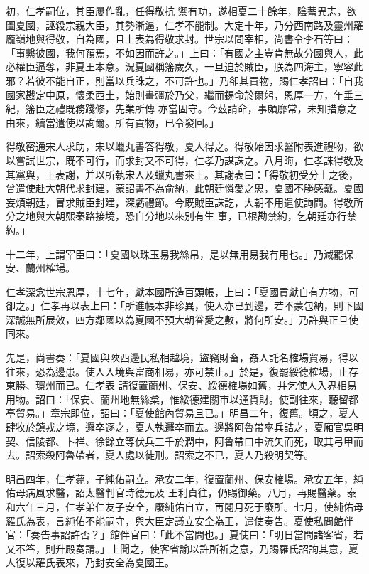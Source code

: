 \begin{pinyinscope}
 初，仁孝嗣位，其臣屢作亂，任得敬抗
 禦有功，遂相夏二十餘年，陰蓄異志，欲圖夏國，誣殺宗親大臣，其勢漸逼，仁孝不能制。大定十年，乃分西南路及靈州羅龐嶺地與得敬，自為國，且上表為得敬求封。世宗以問宰相，尚書令李石等曰：「事繫彼國，我何預焉，不如因而許之。」上曰：「有國之主豈肯無故分國與人，此必權臣逼奪，非夏王本意。況夏國稱籓歲久，一旦迫於賊臣，朕為四海主，寧容此邪？若彼不能自正，則當以兵誅之，不可許也。」乃卻其貢物，賜仁孝詔曰：「自我國家戡定中原，懷柔西土，始則畫疆於乃父，繼而錫命於爾躬，恩厚一方，年垂三紀，籓臣之禮既務踐修，先業所傳
 亦當固守。今茲請命，事頗靡常，未知措意之由來，續當遣使以詢爾。所有貢物，已令發回。」



 得敬密通宋人求助，宋以蠟丸書答得敬，夏人得之。得敬始因求醫附表進禮物，欲以嘗試世宗，既不可行，而求封又不可得，仁孝乃謀誅之。八月晦，仁孝誅得敬及其黨與，上表謝，并以所執宋人及蠟丸書來上。其謝表曰：「得敬初受分土之後，曾遣使赴大朝代求封建，蒙詔書不為俞納，此朝廷憐愛之恩，夏國不勝感戴。夏國妄煩朝廷，冒求賊臣封建，深虧禮節。今既賊臣誅訖，大朝不用遣使詢問。得敬所分之地與大朝熙秦路接境，恐自分地以來別有生
 事，已根勘禁約，乞朝廷亦行禁約。」



 十二年，上謂宰臣曰：「夏國以珠玉易我絲帛，是以無用易我有用也。」乃減罷保安、蘭州榷場。



 仁孝深念世宗恩厚，十七年，獻本國所造百頭帳，上曰：「夏國貢獻自有方物，可卻之。」仁孝再以表上曰：「所進帳本非珍異，使人亦已到邊，若不蒙包納，則下國深誠無所展效，四方鄰國以為夏國不預大朝眷愛之數，將何所安。」乃許與正旦使同來。



 先是，尚書奏：「夏國與陜西邊民私相越境，盜竊財畜，姦人託名榷場貿易，得以往來，恐為邊患。使人入境與富商相易，亦可禁止。」於是，復罷綏德榷場，止存東勝、環州而已。仁孝表
 請復置蘭州、保安、綏德榷場如舊，并乞使人入界相易用物。詔曰：「保安、蘭州地無絲枲，惟綏德建關市以通貨財。使副往來，聽留都亭貿易。」章宗即位，詔曰：「夏使館內貿易且已。」明昌二年，復舊。頃之，夏人肆牧於鎮戎之境，邏卒逐之，夏人執邏卒而去。邊將阿魯帶率兵詰之，夏廂官吳明契、信陵都、卜祥、徐餘立等伏兵三千於潤中，阿魯帶口中流矢而死，取其弓甲而去。詔索殺阿魯帶者，夏人處以徒刑。詔索之不已，夏人乃殺明契等。



 明昌四年，仁孝薨，子純佑嗣立。承安二年，復置蘭州、保安榷場。承安五年，純佑母病風求醫，詔太醫判官時德元及
 王利貞往，仍賜御藥。八月，再賜醫藥。泰和六年三月，仁孝弟仁友子安全，廢純佑自立，再閱月死于廢所。七月，使純佑母羅氏為表，言純佑不能嗣守，與大臣定議立安全為王，遣使奏告。夏使私問館伴官：「奏告事詔許否？」館伴官曰：「此不當問也。」夏使曰：「明日當問諸客省，若又不答，則升殿奏請。」上聞之，使客省諭以許所祈之意，乃賜羅氏詔詢其意，夏人復以羅氏表來，乃封安全為夏國王。




\end{pinyinscope}
